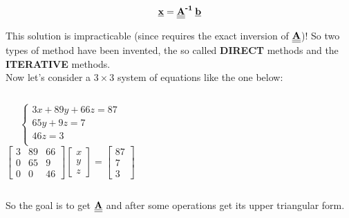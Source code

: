 \documentclass[xcolor={dvipsnames,rgb}, aspectratio=169]{beamer}
\begin{document}
\begin{frame}{}
    \begin{equation*}
        \textbf{\underline{x}} = \textbf{\underline{\underline{A}}}^{\textbf{-1}} \:
        \textbf{\underline{b}}
    \end{equation*}

    This solution is impracticable (since requires the exact inversion of
    $\textbf{\underline{\underline{A}}}$)! So two types of method have been invented, the
    so called \textbf{DIRECT} methods and the \textbf{ITERATIVE} methods. \\ Now let's
    consider a $3 \times 3$ system of equations like the one below: \vspace{1cm}

    \begin{columns}
    \begin{equation*}
        \begin{cases}
            3x + 89y + 66z = 87 \\
            65y + 9z = 7 \\
            46z = 3 \\
        \end{cases}
    \end{equation*}
    \begin{equation*}
        \begin{bmatrix}
        3 & 89 & 66 \\
        0 & 65 & 9 \\
        0 & 0 & 46
        \end{bmatrix}
        \begin{bmatrix}
        x \\ y \\ z
        \end{bmatrix} = 
        \begin{bmatrix}
        87 \\ 7 \\ 3
        \end{bmatrix}
    \end{equation*}
    \end{columns}

    So the goal is to get $\textbf{\underline{\underline{A}}}$ and after some operations
    get its upper triangular form.
\end{frame}
\end{document}
